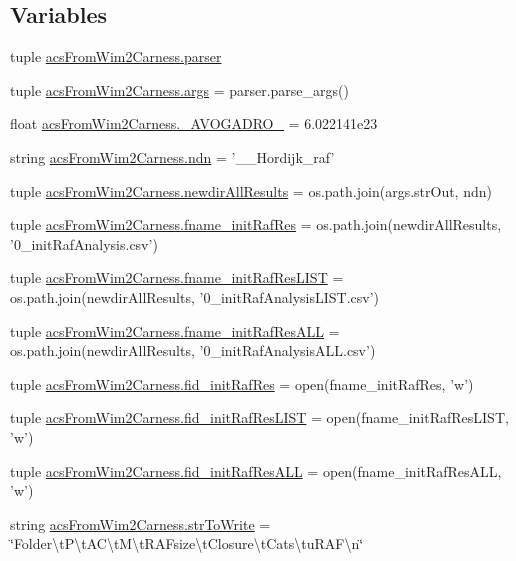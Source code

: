 \subsection*{Variables}
\begin{DoxyCompactItemize}
\item 
tuple \hyperlink{a00128_aed93287ef2c9a4a9ba68f8ffc75aae17}{acs\+From\+Wim2\+Carness.\+parser}
\item 
tuple \hyperlink{a00128_ac4c461267ee7f11bbe525de64f56cd10}{acs\+From\+Wim2\+Carness.\+args} = parser.\+parse\+\_\+args()
\item 
float \hyperlink{a00128_abfe2f871ea28e48198cdd5799807de5b}{acs\+From\+Wim2\+Carness.\+\_\+\+A\+V\+O\+G\+A\+D\+R\+O\+\_\+} = 6.\+022141e23
\item 
string \hyperlink{a00128_a6f995419ddd7f2de58506d9541238dbc}{acs\+From\+Wim2\+Carness.\+ndn} = '\+\_\+\_\+\+Hordijk\+\_\+raf'
\item 
tuple \hyperlink{a00128_a4af2fb5abbd4a6e8930401e66af5b79d}{acs\+From\+Wim2\+Carness.\+newdir\+All\+Results} = os.\+path.\+join(args.\+str\+Out, ndn)
\item 
tuple \hyperlink{a00128_a6df9226d812c675c76a936c215c07e53}{acs\+From\+Wim2\+Carness.\+fname\+\_\+init\+Raf\+Res} = os.\+path.\+join(newdir\+All\+Results, '0\+\_\+init\+Raf\+Analysis.\+csv')
\item 
tuple \hyperlink{a00128_a69f06c42408f8a1ae74e34daa83402b7}{acs\+From\+Wim2\+Carness.\+fname\+\_\+init\+Raf\+Res\+L\+I\+S\+T} = os.\+path.\+join(newdir\+All\+Results, '0\+\_\+init\+Raf\+Analysis\+L\+I\+S\+T.\+csv')
\item 
tuple \hyperlink{a00128_a89c98e628d7938077b4ed18215d4fd9b}{acs\+From\+Wim2\+Carness.\+fname\+\_\+init\+Raf\+Res\+A\+L\+L} = os.\+path.\+join(newdir\+All\+Results, '0\+\_\+init\+Raf\+Analysis\+A\+L\+L.\+csv')
\item 
tuple \hyperlink{a00128_a2f9cfe05abfed3ab6326d0cb094c7c80}{acs\+From\+Wim2\+Carness.\+fid\+\_\+init\+Raf\+Res} = open(fname\+\_\+init\+Raf\+Res, 'w')
\item 
tuple \hyperlink{a00128_a7af2668de12720f3c7925527002d81b0}{acs\+From\+Wim2\+Carness.\+fid\+\_\+init\+Raf\+Res\+L\+I\+S\+T} = open(fname\+\_\+init\+Raf\+Res\+L\+I\+S\+T, 'w')
\item 
tuple \hyperlink{a00128_add1c3bb75f1d98889c27099fc14fc6a8}{acs\+From\+Wim2\+Carness.\+fid\+\_\+init\+Raf\+Res\+A\+L\+L} = open(fname\+\_\+init\+Raf\+Res\+A\+L\+L, 'w')
\item 
string \hyperlink{a00128_a34b3667c3c217a35a0e9b71458d2b233}{acs\+From\+Wim2\+Carness.\+str\+To\+Write} = \char`\"{}Folder\textbackslash{}t\+P\textbackslash{}t\+A\+C\textbackslash{}t\+M\textbackslash{}t\+R\+A\+Fsize\textbackslash{}t\+Closure\textbackslash{}t\+Cats\textbackslash{}tu\+R\+A\+F\textbackslash{}n\char`\"{}

\end{DoxyCompactItemize}

